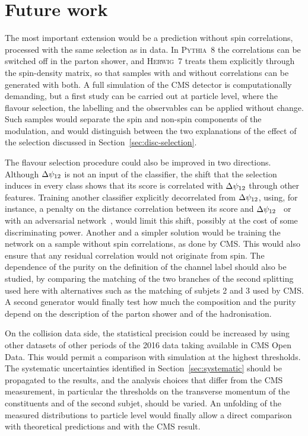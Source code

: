 \section{Future work}
\label{sec:conc-future}

The most important extension would be a prediction without spin correlations, 
processed with the same selection as in data. In \textsc{Pythia}~8 the correlations can
be switched off in the parton shower, and \textsc{Herwig}~7 treats them explicitly
through the spin-density matrix, so that samples with and without correlations can
be generated with both. A full simulation of the CMS detector is computationally
demanding, but a first study can be carried out at particle level, where the
flavour selection, the labelling and the observables can be applied without
change. Such samples would separate the spin and non-spin components of the
modulation, and would distinguish between the two explanations of the effect of
the selection discussed in Section~\ref{sec:disc-selection}.

The flavour selection procedure could also be improved in two directions.
Although $\Delta\psi_{12}$ is not an input of the classifier, the shift that the selection induces in every
class shows that its score is correlated with $\Delta\psi_{12}$ through other features. Training another
classifier explicitly decorrelated from $\Delta\psi_{12}$, using, for instance, a penalty
on the distance correlation between its score and
$\Delta\psi_{12}$~\cite{Kasieczka:2020disco} or with an adversarial network~\cite{Louppe:2017pivot}, 
would limit this shift, possibly at the cost of
some discriminating power. Another and a simpler solution would be training the network
on a sample without spin correlations, as done by CMS. This would also ensure that any
residual correlation would not originate from spin. The dependence of the purity on the definition of the channel label
should also be studied, by comparing the matching of the two branches of the
second splitting used here with alternatives such as the matching of subjets 2 and
3 used by CMS. A second generator would finally test how much the composition and
the purity depend on the description of the parton shower and of the
hadronisation.

On the collision data side, the statistical precision could be increased by using 
other datasets of other periods of the 2016 data taking available in CMS Open Data.
This would permit a comparison with simulation at the highest thresholds. The
systematic uncertainties identified in Section~\ref{sec:systematic} should be
propagated to the results, and the analysis choices that differ from the CMS
measurement, in particular the thresholds on the transverse momentum of the
constituents and of the second subjet, should be varied. An unfolding of the
measured distributions to particle level would finally allow a direct comparison
with theoretical predictions and with the CMS result.

